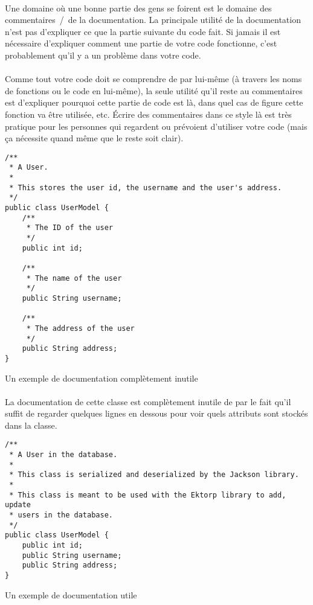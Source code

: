 \paragraph{} Une domaine où une bonne partie des gens se foirent est le domaine
des commentaires~/~de la documentation. La principale utilité de la
documentation n'est pas d'expliquer ce que la partie suivante du code fait. Si
jamais il est nécessaire d'expliquer comment une partie de votre code
fonctionne, c'est probablement qu'il y a un problème dans votre code.

\paragraph{} Comme tout votre code doit se comprendre de par lui-même (à
travers les noms de fonctions ou le code en lui-même), la seule utilité qu'il
reste au commentaires est d'expliquer pourquoi cette partie de code est là,
dans quel cas de figure cette fonction va être utilisée, etc. Écrire des
commentaires dans ce style là est très pratique pour les personnes qui
regardent ou prévoient d'utiliser votre code (mais ça nécessite quand même que
le reste soit clair).

\begin{listing}[H]
	\centering
	\begin{verbatim}
/**
 * A User.
 *
 * This stores the user id, the username and the user's address.
 */
public class UserModel {
	/**
	 * The ID of the user
	 */
	public int id;

	/**
	 * The name of the user
	 */
	public String username;

	/**
	 * The address of the user
	 */
	public String address;
}
	\end{verbatim}
	\caption{Un exemple de documentation complètement inutile}
\end{listing}

\paragraph{} La documentation de cette classe est complètement inutile de par
le fait qu'il suffit de regarder quelques lignes en dessous pour voir quels
attributs sont stockés dans la classe.

\begin{listing}[H]
	\centering
	\begin{verbatim}
/**
 * A User in the database.
 *
 * This class is serialized and deserialized by the Jackson library.
 *
 * This class is meant to be used with the Ektorp library to add, update
 * users in the database.
 */
public class UserModel {
	public int id;
	public String username;
	public String address;
}
	\end{verbatim}
	\caption{Un exemple de documentation utile}
\end{listing}
